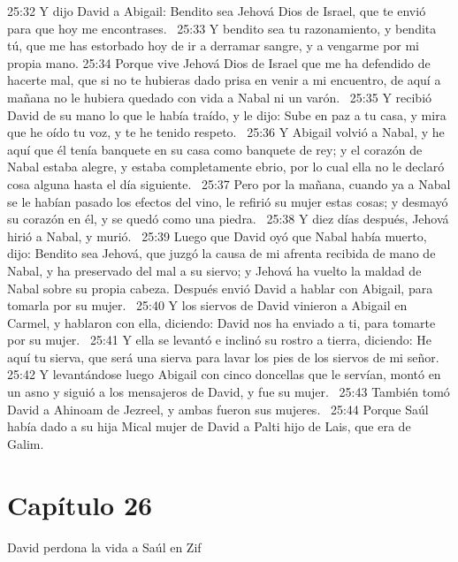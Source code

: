 25:32 Y dijo David a Abigail: Bendito sea Jehová Dios de Israel, que te envió para que hoy me encontrases.  
25:33 Y bendito sea tu razonamiento, y bendita tú, que me has estorbado hoy de ir a derramar sangre, y a vengarme por mi propia mano. 
25:34 Porque vive Jehová Dios de Israel que me ha defendido de hacerte mal, que si no te hubieras dado prisa en venir a mi encuentro, de aquí a mañana no le hubiera quedado con vida a Nabal ni un varón.  
25:35 Y recibió David de su mano lo que le había traído, y le dijo: Sube en paz a tu casa, y mira que he oído tu voz, y te he tenido respeto.  
25:36 Y Abigail volvió a Nabal, y he aquí que él tenía banquete en su casa como banquete de rey; y el corazón de Nabal estaba alegre, y estaba completamente ebrio, por lo cual ella no le declaró cosa alguna hasta el día siguiente.  
25:37 Pero por la mañana, cuando ya a Nabal se le habían pasado los efectos del vino, le refirió su mujer estas cosas; y desmayó su corazón en él, y se quedó como una piedra.  
25:38 Y diez días después, Jehová hirió a Nabal, y murió.  
25:39 Luego que David oyó que Nabal había muerto, dijo: Bendito sea Jehová, que juzgó la causa de mi afrenta recibida de mano de Nabal, y ha preservado del mal a su siervo; y Jehová ha vuelto la maldad de Nabal sobre su propia cabeza. Después envió David a hablar con Abigail, para tomarla por su mujer.  
25:40 Y los siervos de David vinieron a Abigail en Carmel, y hablaron con ella, diciendo: David nos ha enviado a ti, para tomarte por su mujer.  
25:41 Y ella se levantó e inclinó su rostro a tierra, diciendo: He aquí tu sierva, que será una sierva para lavar los pies de los siervos de mi señor.  
25:42 Y levantándose luego Abigail con cinco doncellas que le servían, montó en un asno y siguió a los mensajeros de David, y fue su mujer.  
25:43 También tomó David a Ahinoam de Jezreel, y ambas fueron sus mujeres.  
25:44 Porque Saúl había dado a su hija Mical mujer de David a Palti hijo de Lais, que era de Galim.  
\section*{Capítulo 26}
David perdona la vida a Saúl en Zif  

